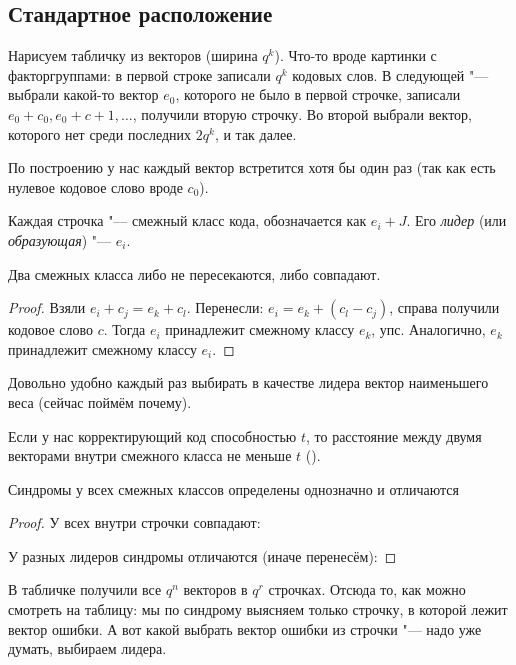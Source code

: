 \subsection{Стандартное расположение}
Нарисуем табличку из векторов (ширина $q^k$).
Что-то вроде картинки с факторгруппами: в первой строке записали $q^k$ кодовых слов.
В следующей "--- выбрали какой-то вектор $e_0$, которого не было в первой строчке,
записали $e_0+c_0, e_0+c+1, \dots$, получили вторую строчку.
Во второй выбрали вектор, которого нет среди последних $2q^k$, и так далее.

По построению у нас каждый вектор встретится хотя бы один раз
(так как есть нулевое кодовое слово вроде $c_0$).

\begin{Def}
	Каждая строчка "--- смежный класс кода, обозначается как $e_i + J$.
	Его \textit{лидер} (или \textit{образующая}) "--- $e_i$.
\end{Def}

\begin{lemma}
	Два смежных класса либо не пересекаются, либо совпадают.
\end{lemma}
\begin{proof}
	Взяли $e_i+c_j=e_k+c_l$.
	Перенесли: $e_i=e_k+(c_l-c_j)$, справа получили кодовое слово $c$.
	Тогда $e_i$ принадлежит смежному классу $e_k$, упс.
	Аналогично, $e_k$ принадлежит смежному классу $e_i$.
	\TODO
\end{proof}

Довольно удобно каждый раз выбирать в качестве лидера вектор наименьшего веса
(сейчас поймём почему).

Если у нас корректирующий код способностью $t$, то расстояние между
двумя векторами внутри смежного класса не меньше $t$ (\TODO).

\begin{theorem}
	Синдромы у всех смежных классов определены однозначно и отличаются
\end{theorem}
\begin{proof}
	У всех внутри строчки совпадают: \TODO

	У разных лидеров синдромы отличаются (иначе перенесём): \TODO
\end{proof}

В табличке получили все $q^n$ векторов в $q^r$ строчках.
Отсюда то, как можно смотреть на таблицу: мы по синдрому выясняем только
строчку, в которой лежит вектор ошибки.
А вот какой выбрать вектор ошибки из строчки "--- надо уже думать,
выбираем лидера.

